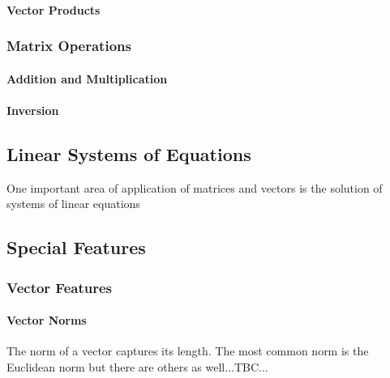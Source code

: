 \paragraph{Vector Products}

\subsubsection{Matrix Operations}
\paragraph{Addition and Multiplication}
\paragraph{Inversion}



\subsection{Linear Systems of Equations}
One important area of application of matrices and vectors is the solution of systems of linear equations



\subsection{Special Features}

\subsubsection{Vector Features}

\paragraph{Vector Norms}
The norm of a vector captures its length. The most common norm is the Euclidean norm but there are others as well...TBC...

